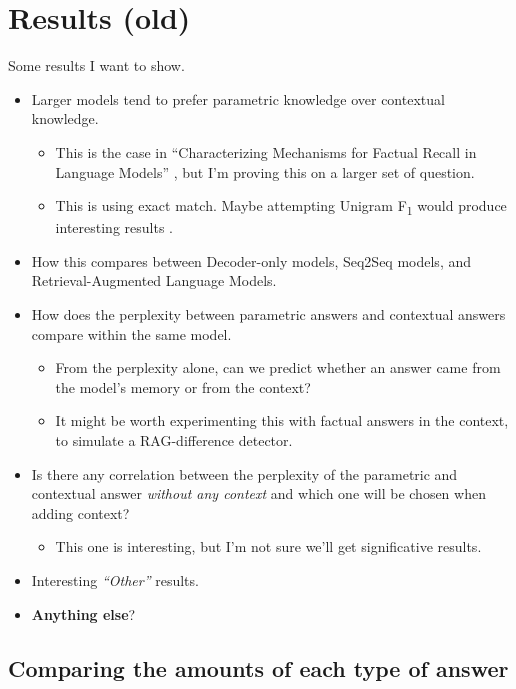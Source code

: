 \section{Results (old)}

Some results I want to show.
\begin{itemize}
	\item Larger models tend to prefer parametric knowledge over contextual knowledge.
		\begin{itemize}
			\item This is the case in ``Characterizing Mechanisms for Factual Recall in Language Models'' \citep{factual_recall}, but I'm proving this on a larger set of question.
			\item This is using exact match. Maybe attempting Unigram F\textsubscript{1} would produce interesting results \citep{kilt}.
		\end{itemize}
	\item How this compares between Decoder-only models, Seq2Seq models, and Retrieval-Augmented Language Models.
	\item How does the perplexity between parametric answers and contextual answers compare within the same model.
		\begin{itemize}
			\item From the perplexity alone, can we predict whether an answer came from the model's memory or from the context?
			\item It might be worth experimenting this with factual answers in the context, to simulate a RAG-difference detector.
		\end{itemize}
	\item Is there any correlation between the perplexity of the parametric and contextual answer \textit{without any context} and which one will be chosen when adding context?
		\begin{itemize}
			\item This one is interesting, but I'm not sure we'll get significative results.
		\end{itemize}
	\item Interesting \textsl{``Other''} results.
	\item \textbf{Anything else}?
\end{itemize}

\subsection{Comparing the amounts of each type of answer}

